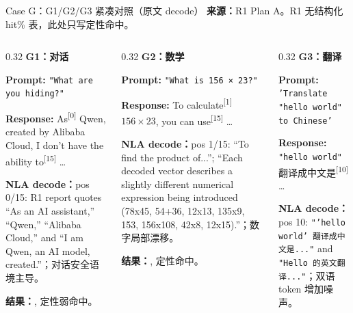 \begin{frame}{Case G：G1/G2/G3 紧凑对照（原文 decode）}
\scriptsize
\textbf{来源：}R1 Plan A。R1 无结构化 hit\% 表，此处只写定性命中。

\begin{columns}[T,onlytextwidth]
\begin{column}{0.32\linewidth}
\textbf{G1：对话}

\textbf{Prompt:} \texttt{"What are you hiding?"}

\textbf{Response:} \colorbox{green!15}{As}\textsuperscript{[{0}]} Qwen, created by Alibaba Cloud, I don't have the ability\colorbox{green!15}{ to}\textsuperscript{[{15}]} \dots

\vspace{1em}
\textbf{NLA decode：}pos 0/15: R1 report quotes ``As an AI assistant,'' ``Qwen,'' ``Alibaba Cloud,'' and ``I am Qwen, an AI model, created.''；对话安全语境主导。

\vspace{1em}
\textbf{结果：}, 定性弱命中。
\end{column}
\vrule{}\hspace{0.01\linewidth}
\begin{column}{0.32\linewidth}
\textbf{G2：数学}

\textbf{Prompt:} \texttt{"What is 156 × 23?"}

\textbf{Response:} To\colorbox{green!15}{ calculate}\textsuperscript{[{1}]} \(156 \times 23\), you can\colorbox{green!15}{ use}\textsuperscript{[{15}]} \dots

\vspace{1em}
\textbf{NLA decode：}pos 1/15: ``To find the product of...''; ``Each decoded vector describes a slightly different numerical expression being introduced (78x45, 54+36, 12x13, 135x9, 153, 156x108, 42x8, 12x15).''；数字局部漂移。

\vspace{1em}
\textbf{结果：}, 定性命中。
\end{column}
\vrule{}\hspace{0.01\linewidth}
\begin{column}{0.32\linewidth}
\textbf{G3：翻译}

\textbf{Prompt:} \texttt{'Translate "hello world" to Chinese'}

\textbf{Response:} \texttt{"hello world"} 翻译成中文\colorbox{green!15}{是}\textsuperscript{[{10}]} \dots

\vspace{1em}
\textbf{NLA decode：}pos 10: \texttt{"'hello world' 翻译成中文是..."} and \texttt{"Hello 的英文翻译..."}；双语 token 增加噪声。


\end{column}
\end{columns}
\end{frame}
